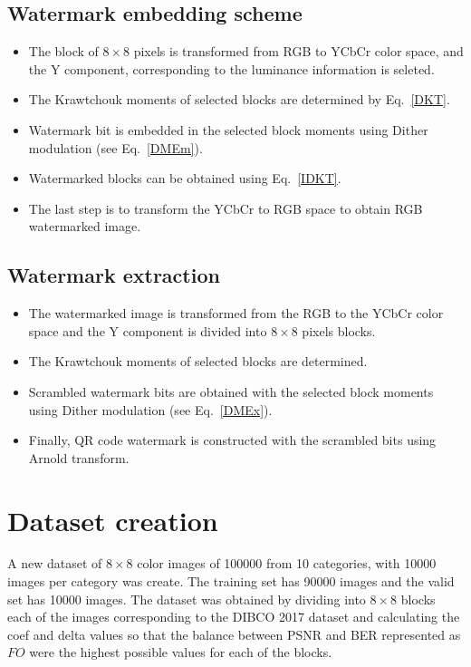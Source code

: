 \documentclass[runningheads]{llncs}
\begin{document}
\subsection*{Watermark embedding scheme}
\begin{itemize}
	\item[\checkmark] The block of $8\times 8$ pixels is transformed from RGB to YCbCr color space, and the Y component, corresponding to the luminance information is seleted.
	\item[\checkmark] The Krawtchouk moments of selected blocks are determined by Eq.~\ref{DKT}.
	\item[\checkmark] Watermark bit is embedded in the selected block moments using Dither modulation (see Eq.~\ref{DMEm}).
	\item[\checkmark] Watermarked blocks can be obtained using Eq.~\ref{IDKT}.
	\item[\checkmark] The last step is to transform the YCbCr to RGB space to obtain RGB watermarked image.
\end{itemize}

\subsection*{Watermark extraction}
\begin{itemize}
	\item[\checkmark] The watermarked image is transformed from the RGB to the YCbCr color space and the Y component is divided into $8\times 8$ pixels blocks.
	\item[\checkmark] The Krawtchouk moments of selected blocks are determined.
	\item[\checkmark] Scrambled watermark bits are obtained with the selected block moments using Dither modulation (see Eq.~\ref{DMEx}).
	\item[\checkmark] Finally, QR code watermark is constructed with the scrambled bits using Arnold transform.
\end{itemize}

\section{Dataset creation}

A new dataset of $8\times 8$ color images of 100000 from 10 categories, with 10000 images per category was create. The training set has 90000 images and the valid set has 10000 images. The dataset was obtained by dividing into $8\times 8$ blocks each of the images corresponding to the DIBCO 2017 dataset and calculating the coef and delta values so that the balance between PSNR and BER represented as $FO$ were the highest possible values for each of the blocks.
\end{document}
